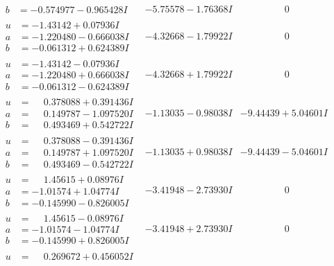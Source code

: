 \documentclass[1p]{elsarticle_modified}
\theoremstyle{definition}
\begin{document}
$$\begin{array}{c|c|c}
\begin{aligned}
b &= -0.574977 - 0.965428 I\end{aligned}
 & -5.75578 - 1.76368 I & \phantom{-0.000000 } 0 \\ \hline\begin{aligned}
u &= -1.43142 + 0.07936 I \\
a &= -1.220480 - 0.666038 I \\
b &= -0.061312 + 0.624389 I\end{aligned}
 & -4.32668 - 1.79922 I & \phantom{-0.000000 } 0 \\ \hline\begin{aligned}
u &= -1.43142 - 0.07936 I \\
a &= -1.220480 + 0.666038 I \\
b &= -0.061312 - 0.624389 I\end{aligned}
 & -4.32668 + 1.79922 I & \phantom{-0.000000 } 0 \\ \hline\begin{aligned}
u &= \phantom{-}0.378088 + 0.391436 I \\
a &= \phantom{-}0.149787 - 1.097520 I \\
b &= \phantom{-}0.493469 + 0.542722 I\end{aligned}
 & -1.13035 - 0.98038 I & -9.44439 + 5.04601 I \\ \hline\begin{aligned}
u &= \phantom{-}0.378088 - 0.391436 I \\
a &= \phantom{-}0.149787 + 1.097520 I \\
b &= \phantom{-}0.493469 - 0.542722 I\end{aligned}
 & -1.13035 + 0.98038 I & -9.44439 - 5.04601 I \\ \hline\begin{aligned}
u &= \phantom{-}1.45615 + 0.08976 I \\
a &= -1.01574 + 1.04774 I \\
b &= -0.145990 - 0.826005 I\end{aligned}
 & -3.41948 - 2.73930 I & \phantom{-0.000000 } 0 \\ \hline\begin{aligned}
u &= \phantom{-}1.45615 - 0.08976 I \\
a &= -1.01574 - 1.04774 I \\
b &= -0.145990 + 0.826005 I\end{aligned}
 & -3.41948 + 2.73930 I & \phantom{-0.000000 } 0 \\ \hline\begin{aligned}
u &= \phantom{-}0.269672 + 0.456052 I \\

\end{aligned}
\end{array}$$
\end{document}

